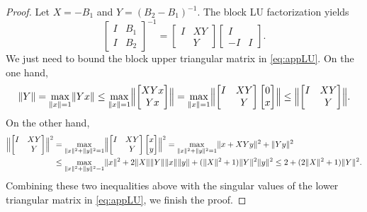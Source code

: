 \documentclass{article}
\providecommand{\norm}[1]{\lVert#1\rVert}
\providecommand{\Bignorm}[1]{\Bigl\lVert#1\Bigr\rVert}
\begin{document}
\begin{proof}
Let $X=-B_{1}$ and $Y=(B_{2}-B_{1})^{-1}$. The block LU factorization yields  
\begin{equation}
    \label{eq:appLU}
    \begin{bmatrix}
        I & B_{1} \\ 
        I & B_{2}
    \end{bmatrix}^{-1}
    = 
    \begin{bmatrix}
        I & XY \\  & Y
    \end{bmatrix}
    \begin{bmatrix}
        I & \\ -I & I
    \end{bmatrix}.
\end{equation}
We just need to bound the block upper triangular matrix in \cref{eq:appLU}.
On the one hand,
\begin{equation*}
    \norm{Y} = \max_{\norm{x}=1}\norm{Yx} \leq \max_{\norm{x}=1}\Bignorm{\begin{bmatrix}
        XYx\\ Yx
    \end{bmatrix}}  = \max_{\norm{x}=1}\Bignorm{\begin{bmatrix}
        I & XY \\ 
        & Y
    \end{bmatrix} \begin{bmatrix}
        0\\ x
    \end{bmatrix}} \leq \Bignorm{\begin{bmatrix}
        I & XY \\ 
        & Y
    \end{bmatrix} }.
\end{equation*} 
On the other hand, 
\begin{equation*}
    \begin{aligned}
        \Bignorm{\begin{bmatrix}
        I & XY \\ 
        & Y
    \end{bmatrix}}^{2} 
    &= \max_{\norm{x}^{2}+\norm{y}^{2}=1}
    \Bignorm{\begin{bmatrix}
        I & XY \\ 
        & Y
    \end{bmatrix}\begin{bmatrix}
        x\\ y
    \end{bmatrix}}^{2}
    = \max_{\norm{x}^{2}+\norm{y}^{2}=1}\norm{x+XYy}^{2}+\norm{Yy}^{2} \\ 
    & \leq \max_{\norm{x}^{2}+\norm{y}^{2}=1}  \norm{x}^{2}+ 2\norm{X}\norm{Y}\norm{x}\norm{y}+(\norm{X}^{2}+1)\norm{Y}^{2}\norm{y}^{2}
    \leq 2+(2\norm{X}^{2}+1)\norm{Y}^{2}.       
    \end{aligned}
\end{equation*}
Combining these two inequalities above with the singular values of the lower triangular matrix in \cref{eq:appLU}, we finish the proof. 
\end{proof}
\end{document}
